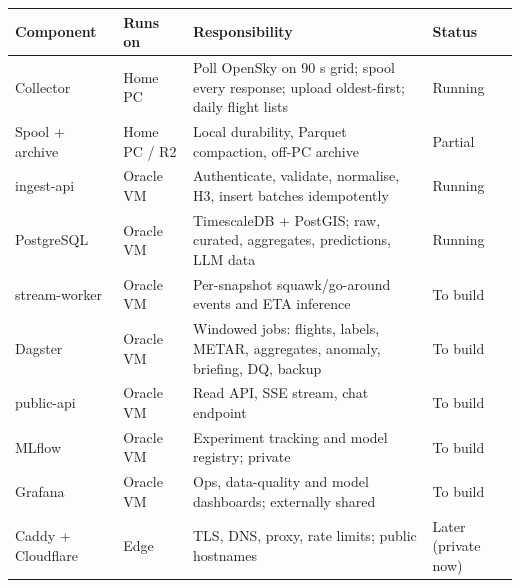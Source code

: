\documentclass[10.5pt]{article}
\begin{document}
\vspace{2pt}
\begin{center}
\end{center}

\begin{tabularx}{\linewidth}{@{}p{3.0cm} p{2.8cm} X p{2.1cm}@{}}
\toprule
\textbf{Component} & \textbf{Runs on} & \textbf{Responsibility} & \textbf{Status} \\
\midrule
Collector & Home PC & Poll OpenSky on 90 s grid; spool every response; upload oldest-first; daily flight lists & Running \\
Spool + archive & Home PC / R2 & Local durability, Parquet compaction, off-PC archive & Partial \\
ingest-api & Oracle VM & Authenticate, validate, normalise, H3, insert batches idempotently & Running \\
PostgreSQL & Oracle VM & TimescaleDB + PostGIS; raw, curated, aggregates, predictions, LLM data & Running \\
stream-worker & Oracle VM & Per-snapshot squawk/go-around events and ETA inference & To build \\
Dagster & Oracle VM & Windowed jobs: flights, labels, METAR, aggregates, anomaly, briefing, DQ, backup & To build \\
public-api & Oracle VM & Read API, SSE stream, chat endpoint & To build \\
MLflow & Oracle VM & Experiment tracking and model registry; private & To build \\
Grafana & Oracle VM & Ops, data-quality and model dashboards; externally shared & To build \\
Caddy + Cloudflare & Edge & TLS, DNS, proxy, rate limits; public hostnames & Later (private now) \\
\bottomrule
\end{tabularx}
\end{document}
